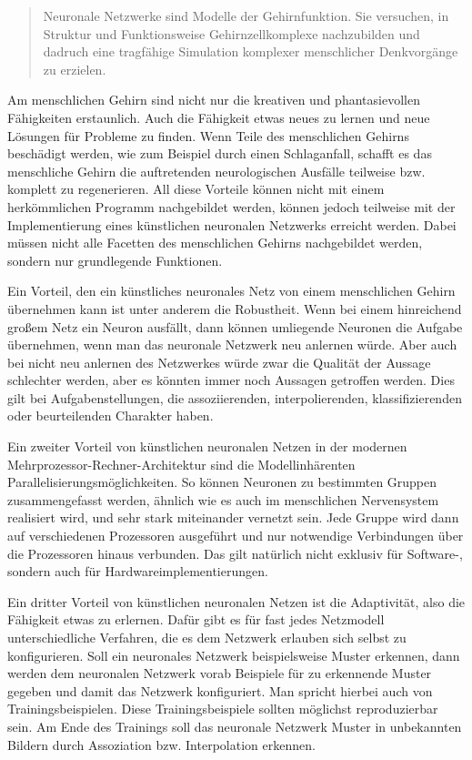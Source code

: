\begin{quote}
    Neuronale Netzwerke sind Modelle der Gehirnfunktion. Sie versuchen, in Struktur und Funktionsweise Gehirnzellkomplexe nachzubilden und dadruch eine tragfähige Simulation komplexer menschlicher Denkvorgänge zu erzielen. \cite[S. 12]{Kratzer1991} 
\end{quote}

Am menschlichen Gehirn sind nicht nur die kreativen und phantasievollen Fähigkeiten erstaunlich. Auch die Fähigkeit etwas neues zu lernen und neue Lösungen für Probleme zu finden. Wenn Teile des menschlichen Gehirns beschädigt werden, wie zum Beispiel durch einen Schlaganfall, schafft es das menschliche Gehirn die auftretenden neurologischen Ausfälle teilweise bzw. komplett zu regenerieren. All diese Vorteile können nicht mit einem herkömmlichen Programm nachgebildet werden, können jedoch teilweise mit der Implementierung eines künstlichen neuronalen Netzwerks erreicht werden. Dabei müssen nicht alle Facetten des menschlichen Gehirns nachgebildet werden, sondern nur grundlegende Funktionen.

Ein Vorteil, den ein künstliches neuronales Netz von einem menschlichen Gehirn übernehmen kann ist unter anderem die Robustheit. Wenn bei einem hinreichend großem Netz ein Neuron ausfällt, dann können umliegende Neuronen die Aufgabe übernehmen, wenn man das neuronale Netzwerk neu anlernen würde. Aber auch bei nicht neu anlernen des Netzwerkes würde zwar die Qualität der Aussage schlechter werden, aber es könnten immer noch Aussagen getroffen werden. Dies gilt bei Aufgabenstellungen, die  assoziierenden, interpolierenden, klassifizierenden oder beurteilenden Charakter haben.

Ein zweiter Vorteil von künstlichen neuronalen Netzen in der modernen Mehrprozessor-Rechner-Architektur sind die Modellinhärenten Parallelisierungsmöglichkeiten. So können Neuronen zu bestimmten Gruppen zusammengefasst werden, ähnlich wie es auch im menschlichen Nervensystem realisiert wird, und sehr stark miteinander vernetzt sein. Jede Gruppe wird dann auf verschiedenen Prozessoren ausgeführt und nur notwendige Verbindungen über die Prozessoren hinaus verbunden. Das gilt natürlich nicht exklusiv für Software-, sondern auch für Hardwareimplementierungen.

Ein dritter Vorteil von künstlichen neuronalen Netzen ist die Adaptivität, also die Fähigkeit etwas zu erlernen. Dafür gibt es für fast jedes Netzmodell unterschiedliche Verfahren, die es dem Netzwerk erlauben sich selbst zu konfigurieren. Soll ein neuronales Netzwerk beispielsweise Muster erkennen, dann werden dem neuronalen Netzwerk vorab Beispiele für zu erkennende Muster gegeben und damit das Netzwerk konfiguriert. Man spricht hierbei auch von Trainingsbeispielen. Diese Trainingsbeispiele sollten möglichst reproduzierbar sein. Am Ende des Trainings soll das neuronale Netzwerk Muster in unbekannten Bildern durch Assoziation bzw. Interpolation erkennen.


